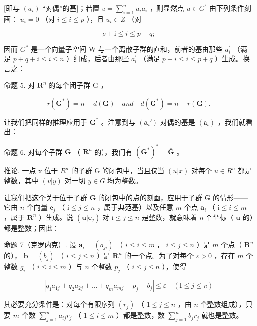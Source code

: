 {[}即与 \((a_{i})\) “对偶”的基{]}；若置 \(u = \sum_{i=1}^{n} u_{i} a_{i}^{\prime}\) ，则显然点 \(u \in G^{*}\) 由下列条件刻画： \(u_{i} = 0\) （对 \(i \leqslant i \leqslant p\) ），且 \(u_{i} \in Z\) （对

\[
p + \mathrm{i} \leqslant i \leqslant p + q;
\]

因而 \(G^{*}\) 是一个向量子空间 W 与一个离散子群的直和，前者的基由那些 \(a_{i}^{\prime}\) （满足 \(p + q + i \leqslant i \leqslant n\) ）组成，后者由那些 \(a_{i}^{\prime}\) （满足 \(p + i \leqslant i \leqslant p + q\) ）生成。换言之：

命题 5. 对 \(\mathbf{R}^n\) 的每个闭子群 G ，

\[
r (\mathbf {G} ^ {*}) = n - d (\mathbf {G}) \quad a n d \quad d (\mathbf {G} ^ {*}) = n - r (\mathbf {G}).
\]

让我们把同样的推理应用于 \(\mathbf{G}^*\) 。注意到与 \((\pmb{a}_i')\) 对偶的基是 \((\pmb{a}_i)\) ，我们就看出：

命题 6. 对每个子群 \(\mathbf{G}\) （ \(\mathbf{R}^n\) 的），我们有 \((\mathbf{G}^*)^* = \overline{\mathbf{G}}\) 。

推论. 一点 x 位于 \(R^{n}\) 的子群 G 的闭包中，当且仅当 \((u|x)\) 对每个 \(u \in R^{n}\) 都是整数，其中 \((u|y)\) 对一切 \(y \in G\) 均为整数。

让我们把这个关于位于子群 \(\mathbf{G}\) 的闭包中的点的刻画，应用于子群 \(\mathbf{G}\) 的情形——它由 \(n\) 个向量 \(\boldsymbol{e}_j\) （ \(\mathrm{i} \leqslant j \leqslant n\) ，属于典范基）以及任意 \(m\) 个点 \(\boldsymbol{a}_i\) （ \(\mathrm{i} \leqslant i \leqslant m\) ，属于 \(\mathbf{R}^n\) ）生成。说 \((\boldsymbol{u}|\boldsymbol{e}_j)\) 对 \(\mathrm{i} \leqslant j \leqslant n\) 是整数，就意味着 \(n\) 个坐标（ \(\boldsymbol{u}\) 的）都是整数；因此：

命题 7（克罗内克）. 设 \(\boldsymbol{a}_i = (a_{ji})\) （ \(i \leqslant i \leqslant m\) ， \(i \leqslant j \leqslant n\) ）是 \(m\) 个点（ \(\mathbf{R}^n\) 的）， \(\boldsymbol{b} = (b_j)\) （ \(i \leqslant j \leqslant n\) ）是 \(\mathbf{R}^n\) 的一个点。为了对每个 \(\varepsilon > 0\) ，存在 \(m\) 个整数 \(g_i\) （ \(i \leqslant i \leqslant m\) ）与 \(n\) 个整数 \(p_j\) （ \(i \leqslant j \leqslant n\) ），使得

\[
\left| q _ {1} a _ {1 j} + q _ {2} a _ {2 j} + \dots + q _ {m} a _ {m j} - p _ {j} - b _ {j} \right| \leqslant \varepsilon \quad (\mathrm{I} \leqslant j \leqslant n)
\]

其必要充分条件是：对每个有限序列 \((r_j)\) （ \(1 \leqslant j \leqslant n\) ，由 \(n\) 个整数组成），只要 \(m\) 个数 \(\sum_{j=1}^{n} a_{ij} r_j\) （ \(1 \leqslant i \leqslant m\) ）都是整数，数 \(\sum_{j=1}^{n} b_j r_j\) 就也是整数。


